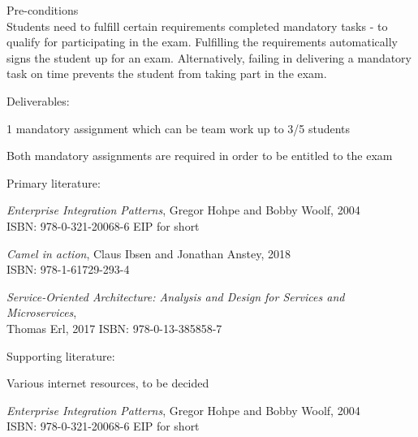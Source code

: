 \documentclass[Screen16to9,17pt]{foils}
\begin{document}
Pre-conditions\\
Students need to fulfill certain requirements  completed mandatory tasks - to qualify for participating in the exam.
Fulfilling the requirements automatically signs the student up for an exam. Alternatively, failing in delivering a mandatory
task on time prevents the student from taking part in the exam.

\begin{list2}
\item Deliverables:
\item 1 mandatory assignment which can be team work up to 3/5 students
\item Both mandatory assignments are required in order to be entitled to the exam
\end{list2}




Primary literature:
\begin{list2}
\item \emph{Enterprise Integration Patterns}, Gregor Hohpe and Bobby Woolf, 2004\\
ISBN: 978-0-321-20068-6 EIP for short
\item \emph{Camel in action}, Claus Ibsen and Jonathan Anstey, 2018\\
ISBN: 978-1-61729-293-4
\item \emph{Service‑Oriented Architecture: Analysis and Design for Services and Microservices},\\ Thomas Erl, 2017
ISBN: 978-0-13-385858-7
\end{list2}
Supporting literature:
\begin{list2}
\item Various internet resources, to be decided
\end{list2}





\emph{Enterprise Integration Patterns}, Gregor Hohpe and Bobby Woolf, 2004\\
ISBN: 978-0-321-20068-6 EIP for short

\end{document}

